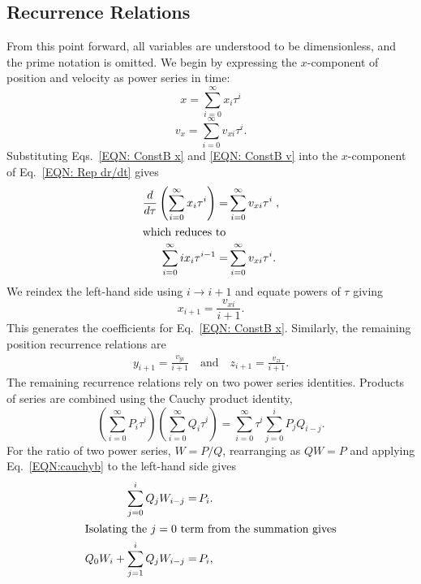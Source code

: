 \documentclass{article}
\begin{document}
\subsection{Recurrence Relations}
From this point forward, all variables are understood to be dimensionless, and the prime notation is omitted. We begin by expressing the $x$-component of position and velocity as power series in time:
        \begin{equation}\label{EQN: ConstB x}
            x=\sum_{i=0}^\infty x_i\tau^i
        \end{equation}
        \begin{equation}\label{EQN: ConstB v}
            v_x=\sum_{i=0}^\infty v_{xi}\tau^i .
        \end{equation}
Substituting Eqs.~\eqref{EQN: ConstB x} and \eqref{EQN: ConstB v} into the
$x$-component of Eq.~\eqref{EQN: Rep dr/dt} gives
    \begin{align*}
            \frac{d}{d\tau}\left(\sum_{i=0}^\infty x_i\tau^i\right)=& \sum_{i=0}^\infty v_{xi}\tau^i\;,\\
\intertext{which reduces to}
            \sum_{i=0}^\infty ix_i\tau^{i-1}=&\sum_{i=0}^\infty v_{xi}\tau^i.
    \end{align*}
We reindex the left-hand side using $i \to i+1$ and equate powers of $\tau$ giving
    \begin{equation*}
        x_{i+1}=\frac{v_{xi}}{i+1}.
    \end{equation*}
This generates the coefficients for Eq.~\eqref{EQN: ConstB x}. Similarly, the remaining position recurrence relations are
        \begin{align*}
            y_{i+1}=\frac{v_{yi}}{i+1}\quad
            \mbox{and}\quad
            z_{i+1}=\frac{v_{zi}}{i+1}.
        \end{align*}
The remaining recurrence relations rely on two power series identities. Products of series are combined using the Cauchy product identity,
        \begin{equation}
            \left(\sum_{i=0}^\infty P_i\tau^i\right)\left(\sum_{i=0}^\infty Q_i\tau^i\right)
            =\sum_{i=0}^\infty\tau^i\sum_{j=0}^i P_jQ_{i-j}.
            \label{EQN:cauchyb}
        \end{equation}
For the ratio of two power series, $W=P/Q$, rearranging as $QW=P$ and applying Eq.~\eqref{EQN:cauchyb} to the left-hand side gives
    \begin{align*}
        \sum_{j=0}^i Q_jW_{i-j}=&\,P_i.\\
\intertext{Isolating the $j=0$ term from the summation gives}
        Q_0W_i+\sum_{j=1}^i Q_jW_{i-j}=&\,P_i,
    \end{align*}
\end{document}
